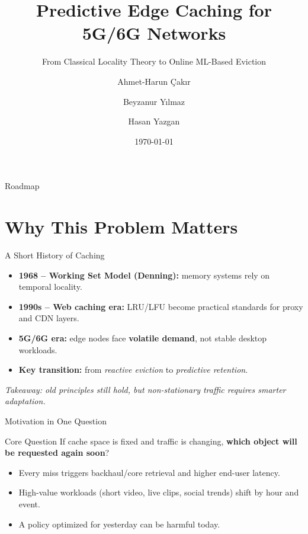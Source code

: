 \documentclass[11pt,aspectratio=169]{beamer}
\title[Predictive Edge Caching]{Predictive Edge Caching for 5G/6G Networks}
\subtitle{From Classical Locality Theory to Online ML-Based Eviction}
\author[]{Ahmet-Harun \c{C}ak{\i}r \and Beyzanur Y{\i}lmaz \and Hasan Yazgan}
\institute[]{Department of Computer Science and Engineering \\ CSE 476/575 Network Systems Project}
\date{\today}
\begin{document}
\begin{frame}
  \titlepage
\end{frame}

\begin{frame}{Roadmap}
  \tableofcontents
\end{frame}

\section{Why This Problem Matters}
\begin{frame}{A Short History of Caching}
  \begin{itemize}
    \item \textbf{1968 -- Working Set Model (Denning):} memory systems rely on temporal locality.
    \item \textbf{1990s -- Web caching era:} LRU/LFU become practical standards for proxy and CDN layers.
    \item \textbf{5G/6G era:} edge nodes face \textbf{volatile demand}, not stable desktop workloads.
    \item \textbf{Key transition:} from \emph{reactive eviction} to \emph{predictive retention}.
  \end{itemize}
  \vspace{0.3cm}
  \textit{Takeaway: old principles still hold, but non-stationary traffic requires smarter adaptation.}
\end{frame}

\begin{frame}{Motivation in One Question}
  \begin{block}{Core Question}
    If cache space is fixed and traffic is changing, \textbf{which object will be requested again soon}?
  \end{block}
  \begin{itemize}
    \item Every miss triggers backhaul/core retrieval and higher end-user latency.
    \item High-value workloads (short video, live clips, social trends) shift by hour and event.
    \item A policy optimized for yesterday can be harmful today.
  \end{itemize}
\end{frame}
\end{document}
